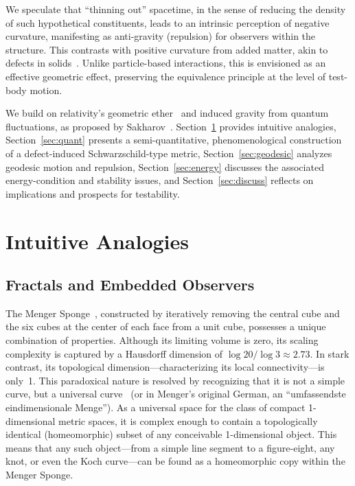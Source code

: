 \documentclass[%
  reprint,
  superscriptaddress,
  showpacs,
  showkeys,
  amsmath,amssymb,
  pra,
  longbibliography,
  floatfix,
  x11names
]{revtex4-2}
\begin{document}
We speculate that ``thinning out'' spacetime, in the sense of reducing the density of such hypothetical constituents, leads to an intrinsic perception of negative curvature, manifesting as anti-gravity (repulsion) for observers within the structure. This contrasts with positive curvature from added matter, akin to defects in solids~\cite{Kroner-1958,kroner-1990}. Unlike particle-based interactions, this is envisioned as an effective geometric effect, preserving the equivalence principle at the level of test-body motion.

We build on relativity's geometric ether~\cite{einstein-aether-en,dirac-aether} and induced gravity from quantum fluctuations, as proposed by Sakharov~\cite{Sakharov-67}. Section~\ref{sec:intuitive} provides intuitive analogies, Section~\ref{sec:quant} presents a semi-quantitative, phenomenological construction of a defect-induced Schwarzschild-type metric, Section~\ref{sec:geodesic} analyzes geodesic motion and repulsion, Section~\ref{sec:energy} discusses the associated energy-condition and stability issues, and Section~\ref{sec:discuss} reflects on implications and prospects for testability.

\section{Intuitive Analogies}
\label{sec:intuitive}

\subsection{Fractals and Embedded Observers}

The Menger Sponge~\cite{Menger1926a_reprint,Menger1926b_reprint,Edgar_ClassicsOnFractals},
constructed by iteratively removing the central cube and the six cubes at the center of each face from a unit cube,
possesses a unique combination of properties.
Although its limiting volume is zero, its scaling complexity is captured by a Hausdorff dimension of $\log 20 / \log 3 \approx 2.73$.
In stark contrast, its topological dimension---characterizing its local connectivity---is only~1.
This paradoxical nature is resolved by recognizing that it is not a simple curve,
but a universal curve~\cite{nobeling-1931} (or in Menger's original German, an ``umfassendste eindimensionale Menge'').
As a universal space for the class of compact 1-dimensional metric spaces,
it is complex enough to contain a topologically identical (homeomorphic) subset of any conceivable 1-dimensional object.
This means that any such object---from a simple line segment to a figure-eight, any knot,
or even the Koch curve---can be found as a homeomorphic copy within the Menger Sponge.
\end{document}
